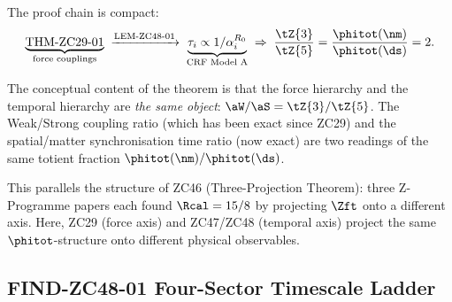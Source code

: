 \documentclass[12pt, a4paper]{article}
\begin{document}
\begin{derivedbox}[title={Commentary on THM-ZC48-01}]
The proof chain is compact:
\[
  \underbrace{\text{THM-ZC29-01}}_{\text{force couplings}}
  \;\xrightarrow{\text{LEM-ZC48-01}}\;
  \underbrace{\tau_i \propto 1/\alpha_i^{R_0}}_{\text{CRF Model A}}
  \;\Rightarrow\;
  \frac{\tZ{3}}{\tZ{5}} = \frac{\phitot(\nm)}{\phitot(\ds)} = 2.
\]

The conceptual content of the theorem is that the force
hierarchy and the temporal hierarchy are \emph{the same object}:
$\aW/\aS = \tZ{3}/\tZ{5}$.
The Weak/Strong coupling ratio (which has been exact since ZC29)
and the spatial/matter synchronisation time ratio (now exact)
are two readings of the same totient fraction
$\phitot(\nm)/\phitot(\ds)$.

This parallels the structure of ZC46 (Three-Projection Theorem):
three Z-Programme papers each found $\Rcal = 15/8$ by projecting
$\Zft$ onto a different axis.
Here, ZC29 (force axis) and ZC47/ZC48 (temporal axis) project
the same $\phitot$-structure onto different physical observables.
\end{derivedbox}

\subsection{FIND-ZC48-01 \quad Four-Sector Timescale Ladder}
\label{sec:find01}

\end{document}
